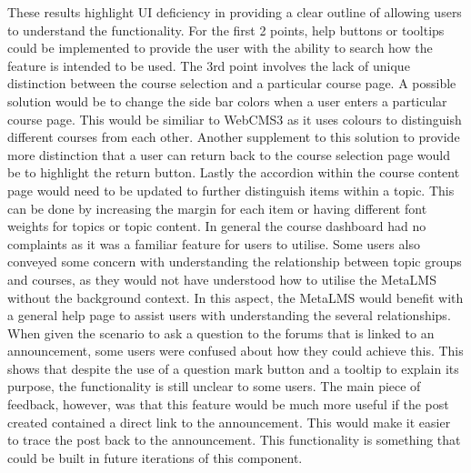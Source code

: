 These results highlight UI deficiency in providing a clear outline of allowing users to understand the functionality.
For the first 2 points, help buttons or tooltips could be implemented to provide the user with the ability to search how the feature is intended to be used.
The 3rd point involves the lack of unique distinction between the course selection and a particular course page. A possible solution would be to change the side bar colors when a user enters a particular course page.
This would be similiar to WebCMS3 as it uses colours to distinguish different courses from each other.
Another supplement to this solution to provide more distinction that a user can return back to the course selection page would be to highlight the return button.
Lastly the accordion within the course content page would need to be updated to further distinguish items within a topic. This can be done by increasing the margin for each item or having different font weights for topics or topic content.
In general the course dashboard had no complaints as it was a familiar feature for users to utilise.
Some users also conveyed some concern with understanding the relationship between topic groups and courses, as they would not have understood how to utilise the MetaLMS without the background context.
In this aspect, the MetaLMS would benefit with a general help page to assist users with understanding the several relationships.
When given the scenario to ask a question to the forums that is linked to an announcement, some users were confused about how they could achieve this.
This shows that despite the use of a question mark button and a tooltip to explain its purpose, the functionality is still unclear to some users.
The main piece of feedback, however, was that this feature would be much more useful if the post created contained a direct link to the announcement.
This would make it easier to trace the post back to the announcement. This functionality is something that could be built in future iterations of this component.

